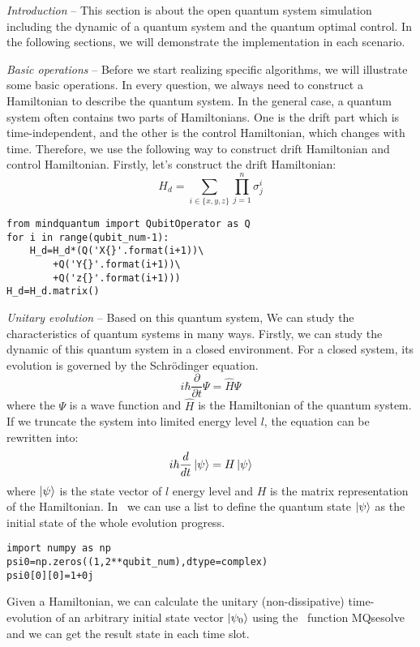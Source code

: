 \textit{Introduction} -- This section is about the open quantum system simulation including the dynamic of a quantum system and the quantum optimal control. In the following sections, we will demonstrate the implementation in each scenario.

\textit{Basic operations} -- Before we start realizing specific algorithms, we will illustrate some basic operations. In every question, we always need to construct a Hamiltonian to describe the quantum system. In the general case, a quantum system often contains two parts of Hamiltonians. One is the drift part which is time-independent, and the other is the control Hamiltonian, which changes with time. Therefore, we use the following way to construct drift Hamiltonian and control Hamiltonian. Firstly, let's construct the drift Hamiltonian:
\begin{equation}
    H_{d}=\sum_{i\in\{x,y,z\}}\prod_{j=1}^{n}\sigma_{j}^{i}
\end{equation}
\begin{lstlisting}
from mindquantum import QubitOperator as Q
for i in range(qubit_num-1):
    H_d=H_d*(Q('X{}'.format(i+1))\
        +Q('Y{}'.format(i+1))\
        +Q('z{}'.format(i+1)))
H_d=H_d.matrix()
\end{lstlisting}
\textit{Unitary evolution} -- Based on this quantum system, We can study the characteristics of quantum systems in many ways. Firstly, we can study the dynamic of this quantum system in a closed environment. For a closed system, its evolution is governed by the Schrödinger equation.
\begin{equation}
    i\hbar\frac{\partial}{\partial t}\Psi=\hat{H}\Psi
\end{equation}
where the $\Psi$ is a wave function and $\hat{H}$ is the Hamiltonian of the quantum system. If we truncate the system into limited energy level $l$, the equation can be rewritten into:
\begin{equation}
    i\hbar\frac{d}{dt}\ket{\psi}=H\ket{\psi}
    \label{shro}
\end{equation}
where $\ket{\psi}$ is the state vector of $l$ energy level and $H$ is the matrix representation of the Hamiltonian. In \MindQuantum\ we can use a list to define the quantum state $\ket{\psi}$ as the initial state of the whole evolution progress. 
\begin{lstlisting}
import numpy as np
psi0=np.zeros((1,2**qubit_num),dtype=complex)
psi0[0][0]=1+0j
\end{lstlisting}
Given a Hamiltonian, we can calculate the unitary (non-dissipative) time-evolution of an arbitrary initial state vector $\ket{\psi_{0}}$ using the \MindQuantum\ function MQsesolve and we can get the result state in each time slot.
